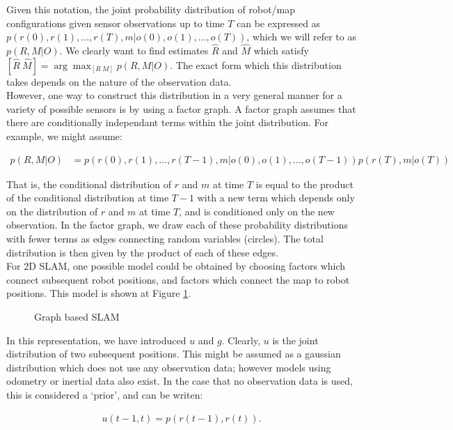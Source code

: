 \documentclass[capstone_report.tex]{subfiles}
\begin{document}
Given this notation, the joint probability distribution of robot/map configurations given sensor observations up to time $T$ can be expressed as $p(r(0), r(1), ... , r(T), m | o(0), o(1), ... , o(T))$, which we will refer to as $p(R,M|O)$. We clearly want to find estimates $\hat{R}$ and $\hat{M}$ which satisfy $[\hat{R} \ \hat{M}] = \arg \max_{[R \  M]} p(R,M|O)$. The exact form which this distribution takes depends on the nature of the observation data.\\

However, one way to construct this distribution in a very general manner for a variety of possible sensors is by using a factor graph. A factor graph assumes that there are conditionally independant terms within the joint distribution. For example, we might assume:

\begin{align*}
  p(R,M|O)&= p(r(0), r(1), ... , r(T-1), m | o(0), o(1), ... , o(T-1))p(r(T), m | o(T))
\end{align*}

That is, the conditional distribution of $r$ and $m$ at time $T$ is equal to the product of the conditional distribution at time $T-1$ with a new term which depends only on the distribution of $r$ and $m$ at time $T$, and is conditioned only on the new observation. In the factor graph, we draw each of these probability distributions with fewer terms as edges connecting random variables (circles). The total distribution is then given by the product of each of these edges.\\ 

For 2D SLAM, one possible model could be obtained by choosing factors which connect subsequent robot positions, and factors which connect the map to robot positions. This model is shown at Figure \ref{fig:graphSlam1}.

\begin{figure}[H]
\centering
  
  \caption{Graph based SLAM\label{fig:graphSlam1}}
\end{figure}

In this representation, we have introduced $u$ and $g$. Clearly, $u$ is the joint distribution of two subsequent positions. This might be assumed as a gaussian distribution which does not use any observation data; however models using odometry or inertial data also exist. In the case that no observation data is used, this is considered a `prior', and can be writen:

\begin{align*}
    u(t-1,t) = p(r(t-1), r(t)). 
\end{align*}
\end{document}
